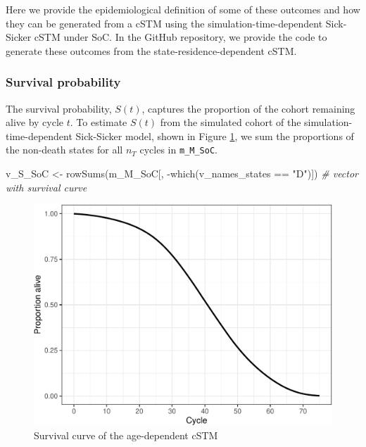 \documentclass[
]{article}
\newenvironment{Shaded}{\begin{snugshade}}{\end{snugshade}}
\newcommand{\CommentTok}[1]{\textcolor[rgb]{0.56,0.35,0.01}{\textit{#1}}}
\newcommand{\FunctionTok}[1]{\textcolor[rgb]{0.00,0.00,0.00}{#1}}
\newcommand{\NormalTok}[1]{#1}
\newcommand{\OtherTok}[1]{\textcolor[rgb]{0.56,0.35,0.01}{#1}}
\newcommand{\SpecialCharTok}[1]{\textcolor[rgb]{0.00,0.00,0.00}{#1}}
\newcommand{\StringTok}[1]{\textcolor[rgb]{0.31,0.60,0.02}{#1}}
\begin{document}
Here we provide the epidemiological definition of some of these outcomes and how they can be generated from a cSTM using the simulation-time-dependent Sick-Sicker cSTM under SoC. In the GitHub repository, we provide the code to generate these outcomes from the state-residence-dependent cSTM.

\hypertarget{survival-probability}{%
\subsubsection{Survival probability}\label{survival-probability}}

The survival probability, \(S(t)\), captures the proportion of the cohort remaining alive by cycle \(t\). To estimate \(S(t)\) from the simulated cohort of the simulation-time-dependent Sick-Sicker model, shown in Figure \ref{fig:Sick-Sicker-Surv-AgeDep}, we sum the proportions of the non-death states for all \(n_T\) cycles in \texttt{m\_M\_SoC}.

\begin{Shaded}
\begin{Highlighting}[]
\NormalTok{v\_S\_SoC }\OtherTok{\textless{}{-}} \FunctionTok{rowSums}\NormalTok{(m\_M\_SoC[, }\SpecialCharTok{{-}}\FunctionTok{which}\NormalTok{(v\_names\_states }\SpecialCharTok{==} \StringTok{"D"}\NormalTok{)]) }\CommentTok{\# vector with survival curve}
\end{Highlighting}
\end{Shaded}

\begin{figure}[H]

{\centering \includegraphics{figs/Sick-Sicker-Surv-AgeDep-1} 

}

\caption{Survival curve of the age-dependent cSTM}\label{fig:Sick-Sicker-Surv-AgeDep}
\end{figure}
\end{document}
